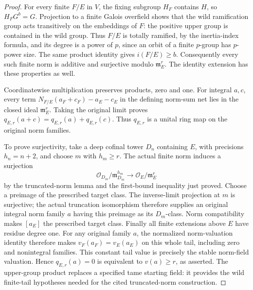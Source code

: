 \begin{proof}
For every finite $F/E$ in $V$, the fixing subgroup $H_F$ contains $H$,
so $H_FG^b=G$. Projection to a finite Galois overfield shows that the
wild ramification group acts transitively on the embeddings of $F$:
the positive upper group is contained in the wild group. Thus
$F/E$ is totally ramified, by the inertia-index formula, and its
degree is a power of $p$, since an orbit of a finite $p$-group has
$p$-power size. The same product identity gives $i(F/E)\geq b$.
Consequently every such finite norm is additive and surjective modulo
$\mathfrak m_E^r$. The identity extension has these properties as well.

Coordinatewise multiplication preserves products, zero and one.
For integral $a,c$, every term
$N_{F/E}(a_F+c_F)-a_E-c_E$ in the defining norm-sum net lies in the
closed ideal $\mathfrak m_E^r$. Taking the original limit proves
$q_{E,r}(a+c)=q_{E,r}(a)+q_{E,r}(c)$. Thus $q_{E,r}$ is a unital
ring map on the original norm families.

To prove surjectivity, take a deep cofinal tower $D_n$ containing $E$,
with precisions $h_n=n+2$, and choose $m$ with $h_m\geq r$.
The actual finite norm induces a surjection
\[
 \mathcal O_{D_m}/\mathfrak m_{D_m}^{h_m}
    \longrightarrow\mathcal O_E/\mathfrak m_E^r
\]
by the truncated-norm lemma and the first-bound inequality just proved.
Choose a preimage of the prescribed target class. The inverse-limit
projection at $m$ is surjective; the actual truncation isomorphism
therefore supplies an original integral norm family $a$ having this
preimage as its $D_m$-class. Norm compatibility makes $[a_E]$ the
prescribed target class. Finally all finite extensions above $E$ have
residue degree one. For any original family $a$, the normalized
norm-valuation identity therefore makes $v_F(a_F)=v_E(a_E)$ on this
whole tail, including zero and nonintegral families. This
constant tail value is precisely the stable norm-field valuation.
Hence $q_{E,r}(a)=0$ is equivalent to $v(a)\geq r$, as asserted.
The upper-group product replaces a specified tame starting field: it
provides the wild finite-tail hypotheses needed for the cited
truncated-norm construction.
\end{proof}

